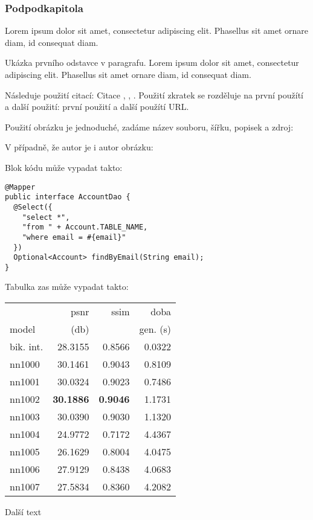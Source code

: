 		\subsubsection{Podpodkapitola}

		Lorem ipsum dolor sit amet, consectetur adipiscing elit. Phasellus sit amet ornare diam, id consequat diam.


			\noindent Ukázka prvního odstavce v paragrafu. Lorem ipsum dolor sit amet, consectetur adipiscing elit. Phasellus sit amet ornare diam, id consequat diam.

			Následuje použití citací: Citace \cite{html_hypertext_markup_language}, \cite{hibernate_docs}, \cite{ddd_quickly}.
			Použití zkratek se rozděluje na první použítí a další použití: první použití  a další použítí \ac{URL}.

			Použití obrázku je jednoduché, zadáme název souboru, šířku, popisek a zdroj:


			V případně, že autor je i autor obrázku:


			Blok kódu může vypadat takto:

			\begin{codeblock}
				\begin{verbatim}
@Mapper
public interface AccountDao {
  @Select({
    "select *",
    "from " + Account.TABLE_NAME,
    "where email = #{email}"
  })
  Optional<Account> findByEmail(String email);
}
				\end{verbatim}
			\end{codeblock}

			Tabulka zas může vypadat takto:

			\begin{table}[hbt!]
				\centering
				\begin{tabular}{| l | r | r | r | }
					\hline
					&        psnr &      ssim &      doba  \\
					model &       (db)    &           & gen. (s) \\
					\hline
					bik. int. & 28.3155 & 0.8566 & 0.0322 \\
					nn1000    & 30.1461 & 0.9043 & 0.8109 \\
					nn1001    & 30.0324 & 0.9023 & 0.7486 \\
					nn1002    & \textbf{30.1886} & \textbf{0.9046} & 1.1731 \\
					nn1003    & 30.0390 & 0.9030 & 1.1320 \\
					nn1004    & 24.9772 & 0.7172 & 4.4367 \\
					nn1005    & 26.1629 & 0.8004 & 4.0475 \\
					nn1006    & 27.9129 & 0.8438 & 4.0683 \\
					nn1007    & 27.5834 & 0.8360 & 4.2082 \\
					\hline
				\end{tabular}
			\end{table}

			\newpage

			Další text


